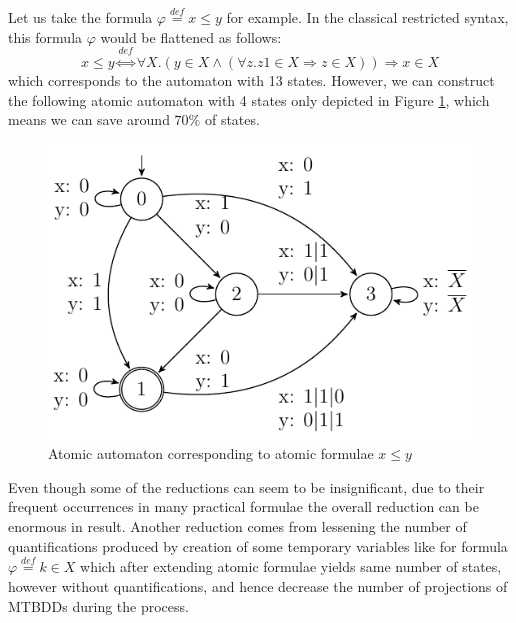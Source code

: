  \begin{example}
 Let us take the formula $\varphi \overset{\mathit{def}}{=} x \leq y$ for
 example.
 In the classical restricted syntax, this formula $\varphi$ would be flattened as follows:
 \begin{equation}
  x \leq y \overset{\mathit{def}}{\Leftrightarrow} \forall X. (y \in X \wedge
  (\forall z.
  z1 \in X \Rightarrow z \in X)) \Rightarrow x \in X
 \end{equation} 
 which corresponds to the automaton with 13 states. However, we can construct
 the following atomic automaton with 4 states only depicted in Figure
 \ref{less-eq}, which means we can save around $70\%$ of states.
 \begin{figure}[h!]
 \begin{center}
  \includegraphics{fig/atomic-x-lesseq-y}
 \end{center}
 \caption{Atomic automaton corresponding to atomic formulae $x \leq
 y$}\label{less-eq}
\end{figure}
 \end{example}
 \noindent\hrulefill

 Even though some of the reductions can seem to be
 insignificant, due to their frequent occurrences in many practical formulae the
 overall reduction can be enormous in result. Another reduction comes from
 lessening the number of quantifications produced by creation of some temporary
 variables like for formula $\varphi \overset{\mathit{def}}{=} k \in X$ which
 after extending atomic formulae yields same number of states, however without
 quantifications, and hence decrease the number of projections of MTBDDs during
 the process.
 

